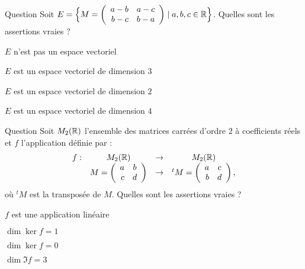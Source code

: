 \begin{multi}[multiple,feedback=
{On vérifie que \(E\) est un espace vectoriel, que
\[E=\Big\{M =\left(\begin{array}{rc}
\alpha&\beta\\ \beta - \alpha&-\alpha\\ 
\end{array}\right)\mid \alpha, \beta \in \Rr \Big\}\] 
et que \(\left \{\left(\begin{array}{rc} 1&0\\
-1&-1\\ \end{array}\right), \;  \left(\begin{array}{rc}
0&1\\ 1&0\\ \end{array}\right) \right \}\) est  une base de \(E\). Donc \(\dim E = 2\).
}]{Question}
Soit \(E=\Big\{M =\left(\begin{array}{rc}a-b&a-c\\b-c&b-a\end{array}\right)\mid a,b,c\in \mathbb{R}\Big\}\). Quelles sont les assertions vraies ?

    \item \(E\) n'est pas un espace vectoriel
    \item \(E\) est un espace vectoriel de dimension \(3\)
    \item* \(E\) est un espace vectoriel de dimension \(2\)
    \item \(E\) est un espace vectoriel de dimension \(4\)
\end{multi}


\begin{multi}[multiple,feedback=
{On vérifie que \(f\) est une application linéaire, \(\ker f =\{0\}\) et \(\Im f = M_2(\Rr)\). Donc \(\dim \ker f = 0\) et \( \dim \Im f = 4\).
}]{Question}
Soit \( M_2(\mathbb{R})\) l'ensemble des matrices carrées d'ordre \(2\) à coefficients réels  et 
\(f\) l'application  définie par :
\[\begin{array}{rccc}f:&M_2(\mathbb{R})&\to& M_2(\mathbb{R})\\
& M = \left(\begin{array}{rc}a&b\\ c&d\\ 
\end{array}\right) &\to &^tM = \left(\begin{array}{rc}
a&c\\b&d\\ \end{array}\right),  \end{array}\]
où \(^tM\) est la transposée de \(M\). Quelles sont les assertions vraies ?

    \item* \(f\) est une application linéaire
    \item \(\dim \ker f = 1\)
    \item* \(\dim \ker f = 0\)
    \item \(\dim \Im f = 3\)
\end{multi}


